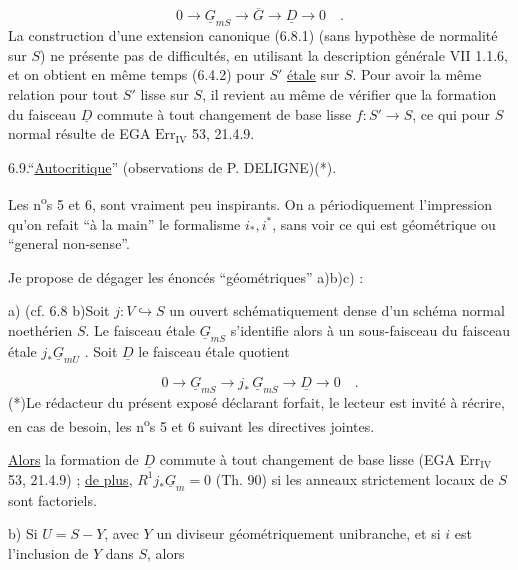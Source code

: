 \begin{equation}\tag{6.8.1}
0 \longrightarrow \underline{G}_{mS} \longrightarrow \overline{G} \longrightarrow \underline{D} \longrightarrow 0 \quad .
\end{equation}
La construction d'une extension canonique (6.8.1) (sans hypothèse de normalité sur $S$) ne présente pas de difficultés, en utilisant la description générale VII 1.1.6, et on obtient en même temps (6.4.2) pour $S'$ \underline{étale} sur $S$. Pour avoir la même relation pour tout $S'$ lisse sur $S$, il revient au même de vérifier que la formation du faisceau $\underline{D}$ commute à tout changement de base lisse $f: S' \longrightarrow S$, ce qui pour $S$ normal résulte de EGA $\mathrm{Err}_{\mathrm{IV}}$ 53, 21.4.9.


6.9.\quad ``\underline{Autocritique}'' (observations de P. DELIGNE)(*).

Les n\textsuperscript{o}s 5 et 6, sont vraiment peu inspirants. On a périodiquement l'impression qu'on refait ``à la main'' le formalisme $i_*,i^*$, sans voir ce qui est géométrique ou ``general non-sense''.

Je propose de dégager les énoncés ``géométriques'' a)b)c) :

a) (cf. 6.8 b)\quad Soit $j:V \hookrightarrow S$ un ouvert schématiquement dense d'un schéma normal noethérien $S$. Le faisceau étale $\underline{G}_{mS}$ s'identifie alors à un sous-faisceau du faisceau étale $j_{*}\underline{G}_{mU}$ . Soit $\underline{D}$ le faisceau étale quotient

\begin{equation*}
0 \longrightarrow \underline{G}_{mS} \longrightarrow j_{*} \, \underline{G}_{mS} \longrightarrow \underline{D} \longrightarrow 0 \quad .
\end{equation*}
(*)\quad Le rédacteur du présent exposé déclarant forfait, le lecteur est invité à récrire, en cas de besoin, les n\textsuperscript{o}s 5 et 6 suivant les directives jointes.



\underline{Alors} la formation de $\underline{D}$ commute à tout changement de base lisse (EGA Err$_{\mathrm{IV}}$ 53, 21.4.9) ; \underline{de plus}, $R^1 j_* \underline{G}_m = 0$ (Th. 90) si les anneaux strictement locaux de $S$ sont factoriels.

b) Si $U = S-Y$, avec $Y$ un diviseur géométriquement unibranche, et si $i$ est l'inclusion de $Y$ dans $S$, alors

